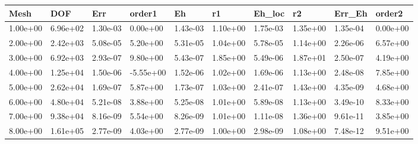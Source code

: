 \begin{tabular}{llllllllll}
Mesh & DOF & Err & order1 & Eh & r1 & Eh_loc & r2 & Err_Eh & order2 \\ 
\hline 
1.00e+00 & 6.96e+02 & 1.30e-03 &  0.00e+00 & 1.43e-03 & 1.10e+00 & 1.75e-03 & 1.35e+00 & 1.35e-04 & 0.00e+00 \\ 
2.00e+00 & 2.42e+03 & 5.08e-05 &  5.20e+00 & 5.31e-05 & 1.04e+00 & 5.78e-05 & 1.14e+00 & 2.26e-06 & 6.57e+00 \\ 
3.00e+00 & 6.92e+03 & 2.93e-07 &  9.80e+00 & 5.43e-07 & 1.85e+00 & 5.49e-06 & 1.87e+01 & 2.50e-07 & 4.19e+00 \\ 
4.00e+00 & 1.25e+04 & 1.50e-06 & -5.55e+00 & 1.52e-06 & 1.02e+00 & 1.69e-06 & 1.13e+00 & 2.48e-08 & 7.85e+00 \\ 
5.00e+00 & 2.62e+04 & 1.69e-07 &  5.87e+00 & 1.73e-07 & 1.03e+00 & 2.41e-07 & 1.43e+00 & 4.35e-09 & 4.68e+00 \\ 
6.00e+00 & 4.80e+04 & 5.21e-08 &  3.88e+00 & 5.25e-08 & 1.01e+00 & 5.89e-08 & 1.13e+00 & 3.49e-10 & 8.33e+00 \\ 
7.00e+00 & 9.38e+04 & 8.16e-09 &  5.54e+00 & 8.26e-09 & 1.01e+00 & 1.11e-08 & 1.36e+00 & 9.61e-11 & 3.85e+00 \\ 
8.00e+00 & 1.61e+05 & 2.77e-09 &  4.03e+00 & 2.77e-09 & 1.00e+00 & 2.98e-09 & 1.08e+00 & 7.48e-12 & 9.51e+00 \\ 
\hline 
\end{tabular}